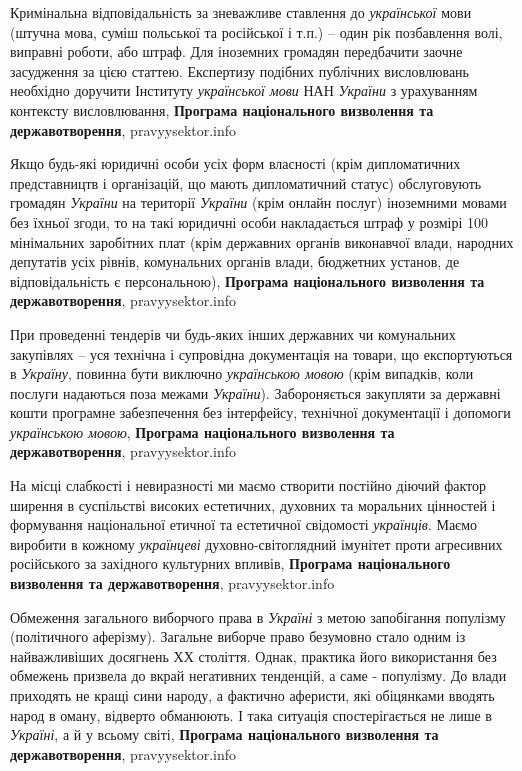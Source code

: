 Кримінальна відповідальність за зневажливе ставлення до \emph{української} мови
(штучна мова, суміш польської та російської і т.п.) – один рік позбавлення
волі, виправні роботи, або штраф. Для іноземних громадян передбачити заочне
засудження за цією статтею. Експертизу подібних публічних висловлювань
необхідно доручити Інституту \emph{української мови} НАН \emph{України} з урахуванням
контексту висловлювання,
\textbf{Програма національного визволення та державотворення}, pravyysektor.info

Якщо будь-які юридичні особи усіх форм власності (крім дипломатичних
представництв і організацій, що мають дипломатичний статус) обслуговують
громадян \emph{України} на території \emph{України} (крім онлайн послуг) іноземними мовами
без їхньої згоди, то на такі юридичні особи накладається штраф у розмірі 100
мінімальних заробітних плат (крім державних органів виконавчої влади, народних
депутатів усіх рівнів, комунальних органів влади, бюджетних установ, де
відповідальність є персональною),
\textbf{Програма національного визволення та державотворення}, pravyysektor.info

При проведенні тендерів чи будь-яких інших державних чи комунальних закупівлях
– уся технічна і супровідна документація на товари, що експортуються в
\emph{Україну}, повинна бути виключно \emph{українською мовою} (крім випадків,
коли послуги надаються поза межами \emph{України}). Забороняється закупляти за
державні кошти програмне забезпечення без інтерфейсу, технічної документації і
допомоги \emph{українською мовою},
\textbf{Програма національного визволення та державотворення}, pravyysektor.info

На місці слабкості і невиразності ми маємо створити постійно діючий фактор
ширення в суспільстві високих естетичних, духовних та моральних цінностей і
формування національної етичної та естетичної свідомості \emph{українців}.
Маємо виробити в кожному \emph{українцеві} духовно-світоглядний імунітет проти
агресивних російського за західного культурних впливів,
\textbf{Програма національного визволення та державотворення}, pravyysektor.info

Обмеження загального виборчого права в \emph{Україні} з метою запобігання популізму
(політичного аферізму).  Загальне виборче право безумовно стало одним із
найважливіших досягнень ХХ століття. Однак, практика його використання без
обмежень призвела до вкрай негативних тенденцій, а саме - популізму. До влади
приходять не кращі сини народу, а фактично аферисти, які обіцянками вводять
народ в оману, відверто обманюють. І така ситуація спостерігається не лише в
\emph{Україні}, а й у всьому світі,
\textbf{Програма національного визволення та державотворення}, pravyysektor.info


